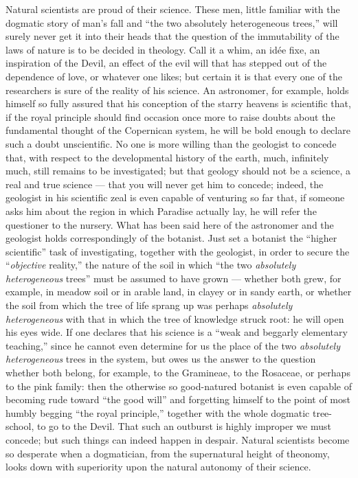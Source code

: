 \documentclass[12pt]{book}
\newcommand{\opage}[1]{\marginnote{\footnotesize\textit{[#1]}}}
\begin{document}
Natural scientists are proud of their science. These men, little familiar with the dogmatic story of man's fall and ``the two absolutely heterogeneous trees,'' will surely never get it into their heads that the question of the immutability of the laws of nature is to be decided in theology. Call it a whim, an idée fixe, an inspiration of the Devil, an effect of the evil will that has stepped out of the dependence
\opage{20}\setcounter{footnote}{0}%
of love, or whatever one likes; but certain it is that every one of the researchers is sure of the reality of his science. An astronomer, for example, holds himself so fully assured that his conception of the starry heavens is scientific that, if the royal principle should find occasion once more to raise doubts about the fundamental thought of the Copernican system, he will be bold enough to declare such a doubt unscientific. No one is more willing than the geologist to concede that, with respect to the developmental history of the earth, much, infinitely much, still remains to be investigated; but that geology should not be a science, a real and true science --- that you will never get him to concede; indeed, the geologist in his scientific zeal is even capable of venturing so far that, if someone asks him about the region in which Paradise actually lay, he will refer the questioner to the nursery. What has been said here of the astronomer and the geologist holds correspondingly of the botanist. Just set a botanist the ``higher scientific'' task of investigating, together with the geologist, in order to secure the ``\emph{objective} reality,'' the nature of the soil in which ``the two \emph{absolutely heterogeneous} trees'' must be assumed to have grown --- whether both grew, for example, in meadow soil or in arable land, in clayey or in sandy earth, or whether the soil from which the tree of life sprang up was perhaps \emph{absolutely heterogeneous} with that in which the tree of knowledge struck root: he will open his eyes wide. If one declares that his science is a ``weak and beggarly elementary teaching,'' since he cannot even determine for us the place of the two \emph{absolutely heterogeneous} trees in the system, but owes us the answer to the question whether both belong, for example, to the Gramineae, to the Rosaceae, or perhaps to the pink family: then the otherwise so good-natured botanist is even capable of becoming rude toward ``the good will'' and forgetting himself to the point of most humbly begging
\opage{21}\setcounter{footnote}{0}%
``the royal principle,'' together with the whole dogmatic tree-school, to go to the Devil. That such an outburst is highly improper we must concede; but such things can indeed happen in despair. Natural scientists become so desperate when a dogmatician, from the supernatural height of theonomy, looks down with superiority upon the natural autonomy of their science.
\end{document}
